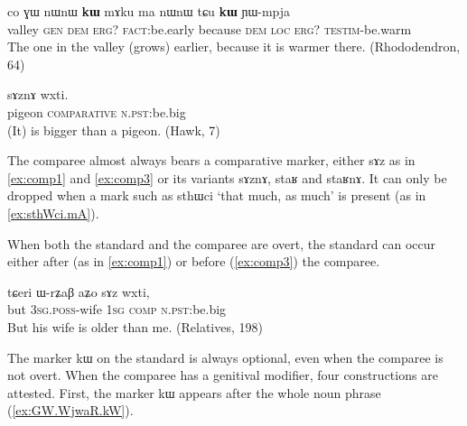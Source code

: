 \documentclass[oldfontcommands,oneside,a4paper,11pt]{article}
\newcommand{\ipa}[1]{{\phon #1}} %
\begin{document}
 \begin{exe}
\ex \label{ex:comp2}
\gll 
\ipa{co}  	\ipa{ɣɯ}  	\ipa{nɯnɯ}  	\ipa{\textbf{kɯ}}  	\ipa{mɤku}  	\ipa{ma}  	\ipa{nɯnɯ} \ipa{tɕu}  	\ipa{\textbf{kɯ}}  	\ipa{ɲɯ-mpja}  \\
valley \textsc{gen} \textsc{dem} \textsc{erg?} \textsc{fact}:be.early because \textsc{dem} \textsc{loc} \textsc{erg?} \textsc{testim}-be.warm \\
\glt The one in the valley (grows) earlier, because it is warmer there. (Rhododendron, 64)
\end{exe}

\begin{exe}
\ex \label{ex:comp3}
\gll  \ipa{qɤjdo}  	\ipa{sɤznɤ}  	\ipa{wxti.}     \\
pigeon \textsc{comparative} \textsc{n.pst:}be.big \\
\glt (It) is bigger than a pigeon. (Hawk, 7)
\end{exe}


The comparee almost always bears a comparative marker, either \ipa{sɤz} as in \ref{ex:comp1} and \ref{ex:comp3} or its variants \ipa{sɤznɤ}, \ipa{staʁ} and \ipa{staʁnɤ}. It can only be dropped when a mark such as \ipa{sthɯci} `that much, as much' is present (as in \ref{ex:sthWci.mA}).

 When both the standard and the comparee are overt, the standard can occur either after (as in  \ref{ex:comp1}) or before (\ref{ex:comp3}) the comparee.  
 
\begin{exe}
\ex \label{ex:comp3}
\gll 
\ipa{tɕeri}  	\ipa{ɯ-rʑaβ}  	\ipa{aʑo}  	\ipa{sɤz}  	\ipa{wxti,}  \\
but \textsc{3sg.poss}-wife \textsc{1sg} \textsc{comp} \textsc{n.pst:}be.big \\
\glt But his wife is older than me. (Relatives, 198)
\end{exe}


The marker \ipa{kɯ} on the standard is always optional, even when the comparee is not overt. When the comparee has a genitival modifier, four constructions are attested. First,  the marker \ipa{kɯ} appears after the whole noun phrase (\ref{ex:GW.WjwaR.kW}). 
\end{document}
